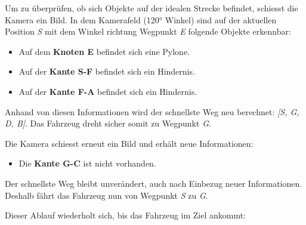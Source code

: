 \documentclass[../main.tex]{subfiles}
\begin{document}

Um zu überprüfen, ob sich Objekte auf der idealen Strecke befindet, schiesst die Kamera ein Bild. In dem Kamerafeld (120° Winkel) sind auf der aktuellen Position \textit{S} mit dem Winkel richtung Wegpunkt \textit{E} folgende Objekte erkennbar:
\begin{itemize}
    \item Auf dem \textbf{Knoten E} befindet sich eine Pylone.
    \item Auf der \textbf{Kante S-F} befindet sich ein Hindernis.
    \item Auf der \textbf{Kante F-A} befindet sich ein Hindernis.
\end{itemize}

Anhand von diesen Informationen wird der schnellste Weg neu berechnet: \textit{[S, G, D, B]}. Das Fahrzeug dreht sicher somit zu Wegpunkt \textit{G}. 


Die Kamera schiesst erneut ein Bild und erhält neue Informationen:
\begin{itemize}
    \item Die \textbf{Kante G-C} ist nicht vorhanden.
\end{itemize}

Der schnellste Weg bleibt unverändert, auch nach Einbezug neuer Informationen.
Deshalb fährt das Fahrzeug nun von Wegpunkt \textit{S} zu \textit{G}.


Dieser Ablauf wiederholt sich, bis das Fahrzeug im Ziel ankommt:
\end{document}
